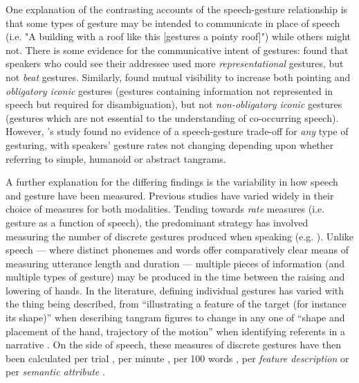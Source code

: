 \documentclass[a4paper,man,natbib]{apa6}
\newcommand*{\term}[1]{\emph{#1}} %
\begin{document}
One explanation of the contrasting accounts of the speech-gesture relationship is that some types of gesture may be intended to communicate in place of speech (i.e. "A building with a roof like this [gestures a pointy roof]") while others might not.
There is some evidence for the communicative intent of gestures: \citet{Alibali2001} found that speakers who could see their addressee used more \term{representational} gestures, but not \term{beat} gestures. 
Similarly, \citet{DeRuiter2012} found mutual visibility to increase both pointing and \term{obligatory iconic} gestures (gestures containing information not represented in speech but required for disambiguation), but not \term{non-obligatory iconic} gestures (gestures which are not essential to the understanding of co-occurring speech).
However, \citeauthor{DeRuiter2012}'s \citeyear{DeRuiter2012} study found no evidence of a speech-gesture trade-off for \emph{any} type of gesturing, with speakers' gesture rates not changing depending upon whether referring to simple, humanoid or abstract tangrams. 

A further explanation for the differing findings is the variability in how speech and gesture have been measured. 
Previous studies have varied widely in their choice of measures for both modalities.
Tending towards \term{rate} measures (i.e. gesture as a function of speech), the predominant strategy has involved measuring the number of discrete gestures produced when speaking (e.g. \citet{Hostetter2007, Gerwing2011, DeRuiter2012, Hoetjes2015}).
Unlike speech --- where distinct phonemes and words offer comparatively clear means of measuring utterance length and duration --- multiple pieces of information (and multiple types of gesture) may be produced in the time between the raising and lowering of hands.
In the literature, defining individual gestures has varied with the thing being described, from ``illustrating a feature of the target (for instance its shape)'' when describing tangram figures \citep{DeRuiter2012} to change in any one of ``shape and placement of the hand, trajectory of the motion'' when identifying referents in a narrative \citep{So2009}.
On the side of speech, these measures of discrete gestures have then been calculated per trial \citep{Morsella2004}, per minute \citep{Mol2011}, per 100 words \citep{Masson-Carro2015, Hostetter2007, Gerwing2011, Hoetjes2015}, per \term{feature description} \citep{DeRuiter2012} or per \term{semantic attribute} \citep{Hoetjes2015}.
\end{document}
